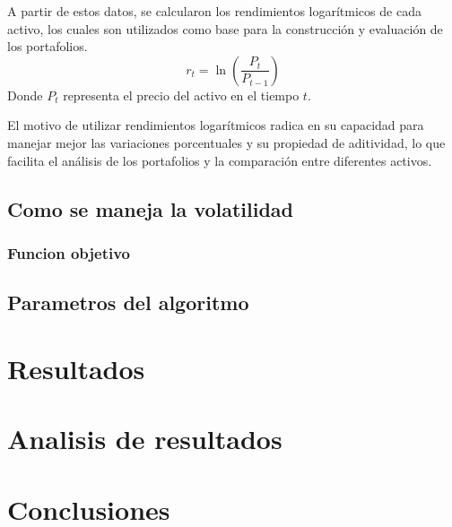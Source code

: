 \documentclass[12pt]{article}
\begin{document}
A partir de estos datos, se calcularon los rendimientos logarítmicos
de cada activo, los cuales son utilizados como base para la
construcción y evaluación de los portafolios.
\begin{equation}
  r_t = \ln\left(\frac{P_t}{P_{t-1}}\right)
\end{equation}
Donde \( P_t \) representa el precio del activo en el tiempo \( t \).

El motivo de utilizar rendimientos logarítmicos radica en su
capacidad para manejar mejor las variaciones porcentuales y su
propiedad de aditividad, lo que facilita el análisis de los
portafolios y la comparación entre diferentes activos.
\subsection{Como se maneja la volatilidad}
\subsubsection{Funcion objetivo}
\subsection{Parametros del algoritmo}
\section{Resultados}
\section{Analisis de resultados}
\section{Conclusiones}
 
\end{document}
